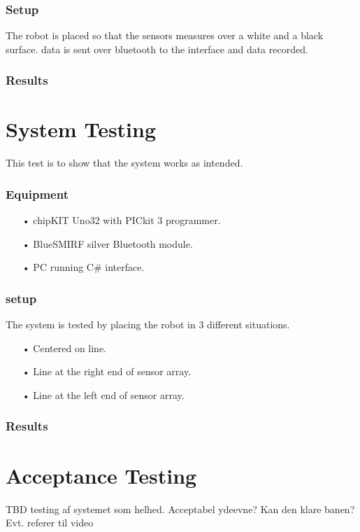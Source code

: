 \subsubsection{Setup}
The robot is placed so that the sensors measures over a white and a black surface.
data is sent over bluetooth to the interface and data recorded.

\subsubsection{Results}

\section{System Testing}
This test is to show that the system works as intended.

\subsubsection{Equipment}
\begin{enumerate}
	\item[•]chipKIT Uno32 with PICkit 3 programmer.
	\item[•]BlueSMIRF silver Bluetooth module.
	\item[•]PC running C\# interface.
\end{enumerate}

\subsubsection{setup}
The system is tested by placing the robot in 3 different situations.
\begin{enumerate}
	\item[•]Centered on line.
	\item[•]Line at the right end of sensor array.
	\item[•]Line at the left end of sensor array.
\end{enumerate}

\subsubsection{Results}

\section{Acceptance Testing}
TBD testing af systemet som helhed. Acceptabel ydeevne?
Kan den klare banen? 
Evt. referer til video





